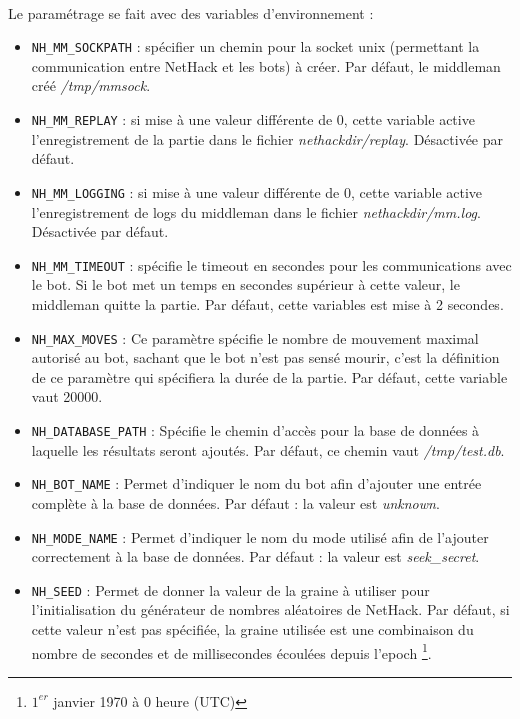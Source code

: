 \documentclass[a4paper,12pt]{article}
\begin{document}
\paragraph{}Le paramétrage se fait avec des variables d'environnement :
\begin{itemize}
\item \verb!NH_MM_SOCKPATH! : spécifier un chemin pour la socket unix
	(permettant la communication entre NetHack et les bots) à créer. Par
	défaut, le middleman créé \emph{/tmp/mmsock}.
\item \verb!NH_MM_REPLAY! : si mise à une valeur différente de 0, cette
	variable active l'enregistrement de la partie dans le fichier
	\emph{nethackdir/replay}. Désactivée par défaut.
\item \verb!NH_MM_LOGGING! : si mise à une valeur différente de 0, cette
	variable active l'enregistrement de logs du middleman dans le fichier
	\emph{nethackdir/mm.log}. Désactivée par défaut.
\item \verb!NH_MM_TIMEOUT! : spécifie le timeout en secondes pour les
	communications avec le bot. Si le bot met un temps en secondes supérieur à
	cette valeur, le middleman quitte la partie. Par défaut, cette variables
	est mise à 2 secondes.
\item \verb!NH_MAX_MOVES! :
  Ce paramètre spécifie le nombre de mouvement maximal autorisé au bot, sachant
  que le bot n'est pas sensé mourir, c'est la définition de ce paramètre qui
  spécifiera la durée de la partie. Par défaut, cette variable vaut 20000.
\item \verb!NH_DATABASE_PATH! :
  Spécifie le chemin d'accès pour la base de données à laquelle les résultats
  seront ajoutés. Par défaut, ce chemin vaut \emph{/tmp/test.db}.
\item \verb!NH_BOT_NAME! :
  Permet d'indiquer le nom du bot afin d'ajouter une entrée complète à la base
  de données. Par défaut : la valeur est \emph{unknown}.
\item \verb!NH_MODE_NAME! :
  Permet d'indiquer le nom du mode utilisé afin de l'ajouter correctement à la
  base de données. Par défaut : la valeur est \emph{seek\_secret}.
\item \verb!NH_SEED! :
  Permet de donner la valeur de la graine à utiliser pour l'initialisation du
  générateur de nombres aléatoires de NetHack. Par défaut, si cette
  valeur n'est pas spécifiée, la graine utilisée est une combinaison du nombre
  de secondes et de millisecondes écoulées depuis l'epoch \footnote{$1^{er}$
  janvier 1970 à 0 heure (UTC)}.

\end{itemize}
\end{document}
